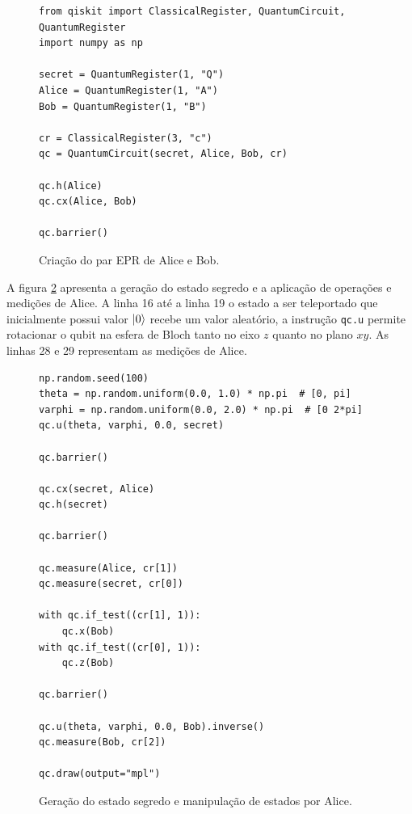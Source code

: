 \begin{figure}[!ht]
\centering
\begin{minipage}{1\textwidth}
\begin{lstlisting}[style=pythonstyle]
from qiskit import ClassicalRegister, QuantumCircuit, QuantumRegister
import numpy as np
 
secret = QuantumRegister(1, "Q")
Alice = QuantumRegister(1, "A")
Bob = QuantumRegister(1, "B")
 
cr = ClassicalRegister(3, "c")
qc = QuantumCircuit(secret, Alice, Bob, cr)

qc.h(Alice)
qc.cx(Alice, Bob)
 
qc.barrier()
\end{lstlisting}
\end{minipage}
\caption{Criação do par EPR de Alice e Bob.}
\label{fig:tq1}
\end{figure}

A figura \ref{fig:tq2} apresenta a geração do estado segredo e a aplicação de operações e medições de Alice. A linha 16 até a linha 19 o estado a ser teleportado que inicialmente possui valor $\ket{0}$ recebe um valor aleatório, a instrução \texttt{qc.u} permite rotacionar o qubit na esfera de Bloch tanto no eixo $z$ quanto no plano $xy$. As linhas 28 e 29 representam as medições de Alice.

\begin{figure}[!ht]
\centering
\begin{minipage}{1\textwidth}
\begin{lstlisting}[style=pythonstyle, firstnumber=16]
np.random.seed(100)
theta = np.random.uniform(0.0, 1.0) * np.pi  # [0, pi]
varphi = np.random.uniform(0.0, 2.0) * np.pi  # [0 2*pi]
qc.u(theta, varphi, 0.0, secret)

qc.barrier()
 
qc.cx(secret, Alice)
qc.h(secret)

qc.barrier()

qc.measure(Alice, cr[1])
qc.measure(secret, cr[0])

with qc.if_test((cr[1], 1)):
    qc.x(Bob)
with qc.if_test((cr[0], 1)):
    qc.z(Bob)

qc.barrier()
 
qc.u(theta, varphi, 0.0, Bob).inverse()
qc.measure(Bob, cr[2])
 
qc.draw(output="mpl")
\end{lstlisting}
\end{minipage}
\caption{Geração do estado segredo e manipulação de estados por Alice.}
\label{fig:tq2}
\end{figure}

